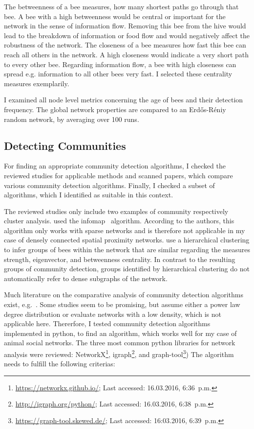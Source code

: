 The betweenness of a bee measures, how many shortest paths go through that bee. A bee with a high betweenness would be central or important for the network in the sense of information flow. Removing this bee from the hive would lead to the breakdown of information or food flow and would negatively affect the robustness of the network.
The closeness of a bee measures how fast this bee can reach all others in the network. A high closeness would indicate a very short path to every other bee. Regarding information flow, a bee with high closeness can spread e.g. information to all other bees very fast.
I selected these centrality measures exemplarily.

I examined all node level metrics concerning the age of bees and their detection frequency. The global network properties are compared to an Erd\H{o}s-R\'{e}niy  random network, by averaging over 100 runs.



\subsection{Detecting Communities}
\label{subsec:APcommunityDet}
For finding an appropriate community detection algorithms, I checked the reviewed studies for applicable methods and scanned papers, which compare various community detection algorithms. Finally, I checked a subset of algorithms, which I identified as suitable in this context.

The reviewed studies only include two examples of community respectively cluster analysis. \textcite{mersch2013tracking} used the infomap~\cite{rosvall2009map,rosvall2007information} algorithm. According to the authors, this algorithm only works with sparse networks and is therefore not applicable in my case of densely connected spatial proximity networks. \textcite{baracchi2014socio} use a hierarchical clustering to infer groups of bees within the network that are similar regarding the measures strength, eigenvector, and betweenness centrality. In contrast to the resulting groups of community detection, groups identified by hierarchical clustering do not automatically refer to dense subgraphs of the network.

Much literature on the comparative analysis of community detection algorithms exist, e.g.~\cite{yang2016comparative, harenberg2014community}. Some studies seem to be promising, but assume either a power law degree distribution or
evaluate networks with a low density, which is not applicable here.
Thererfore, I tested community detection algorithms implemented in python, to find an algorithm, which works well for my case of animal social networks. The three most common python libraries for network analysis were reviewed: NetworkX\footnote{\url{https://networkx.github.io/}; Last accessed: 16.03.2016, 6:36~p.m.}, igraph\footnote{\url{http://igraph.org/python/}; Last accessed: 16.03.2016, 6:38~p.m.}, and graph-tool\footnote{\url{https://graph-tool.skewed.de/}; Last accessed: 16:03.2016, 6:39~p.m.})
The algorithm needs to fulfill the following criterias:

